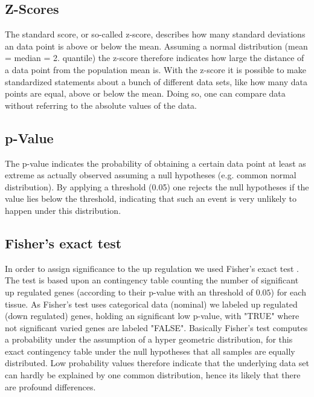   \subsection{Z-Scores}  
  \label{sec:Z-Scores}
  
  The standard score, or so-called z-score, describes how many standard deviations an data point is above or below the mean. Assuming a normal distribution (mean = median = 2. quantile) the z-score therefore indicates how large the distance of a data point from the population mean is.
  With the z-score it is possible to make standardized statements about a bunch of different data sets, like how many data points are equal, above or below the mean. Doing so, one can compare data without referring to the absolute values of the data.

  \subsection{p-Value}
  \label{sec:p-Value}
  
  The p-value indicates the probability of obtaining a certain data point at
least as extreme as actually observed assuming a null hypotheses (e.g. common
normal distribution). By applying a threshold (0.05) one rejects the null
hypotheses if the value lies below the threshold, indicating that such an event
is very unlikely to happen under this distribution.
  
  \subsection{Fisher's exact test}
  \label{sec:fisher}
  
  In order to assign significance to the up regulation we used Fisher's exact test \cite{Fisher1922}. The test is based upon an contingency table counting the number of significant up regulated genes (according to their p-value with an threshold of $0.05$) for each tissue. As Fisher's test uses categorical data (nominal) we labeled up regulated (down regulated) genes, holding an significant low p-value, with "TRUE" where not significant varied genes are labeled "FALSE". Basically Fisher's test computes a probability under the assumption of a hyper geometric distribution, for this exact contingency table under the null hypotheses that all samples are equally distributed. Low probability values therefore indicate that the underlying data set can hardly be explained by one common distribution, hence its likely that there are profound differences.

